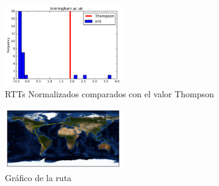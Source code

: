 \begin{figure}[H]
  \centering
    \includegraphics[width=0.45\textwidth]{histogramas_thompson/birmingham-ac-uk.png}
  \caption{RTTs Normalizados comparados con el valor Thompson}
  \label{entropia-s}
\end{figure}

\begin{figure}[H]
  \centering
    \includegraphics[width=0.45\textwidth]{grafico-rutas/birmingham-ac-uk.png}
  \caption{Gráfico de la ruta}
  \label{entropia-s}
\end{figure}